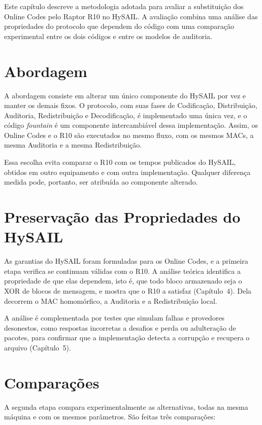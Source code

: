 Este capítulo descreve a metodologia adotada para avaliar a substituição dos Online Codes pelo Raptor R10 no HySAIL. A avaliação combina uma análise das propriedades do protocolo que dependem do código com uma comparação experimental entre os dois códigos e entre os modelos de auditoria.

\section{Abordagem}

A abordagem consiste em alterar um único componente do HySAIL por vez e manter os demais fixos. O protocolo, com suas fases de Codificação, Distribuição, Auditoria, Redistribuição e Decodificação, é implementado uma única vez, e o código \emph{fountain} é um componente intercambiável dessa implementação. Assim, os Online Codes e o R10 são executados no mesmo fluxo, com os mesmos \acrshort{MAC}s, a mesma Auditoria e a mesma Redistribuição.

Essa escolha evita comparar o R10 com os tempos publicados do HySAIL, obtidos em outro equipamento e com outra implementação. Qualquer diferença medida pode, portanto, ser atribuída ao componente alterado.

\section{Preservação das Propriedades do HySAIL}

As garantias do HySAIL foram formuladas para os Online Codes, e a primeira etapa verifica se continuam válidas com o R10. A análise teórica identifica a propriedade de que elas dependem, isto é, que todo bloco armazenado seja o XOR de blocos de mensagem, e mostra que o R10 a satisfaz (Capítulo~4). Dela decorrem o \acrshort{MAC} homomórfico, a Auditoria e a Redistribuição local.

A análise é complementada por testes que simulam falhas e provedores desonestos, como respostas incorretas a desafios e perda ou adulteração de pacotes, para confirmar que a implementação detecta a corrupção e recupera o arquivo (Capítulo~5).

\section{Comparações}

A segunda etapa compara experimentalmente as alternativas, todas na mesma máquina e com os mesmos parâmetros. São feitas três comparações:

